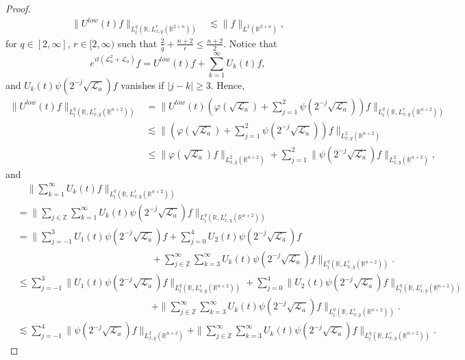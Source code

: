 \documentclass[a4paper,11pt, reqno]{amsart}
\numberwithin{equation}{section}
\theoremstyle{plain}
\theoremstyle{definition}
\theoremstyle{remark}
\begin{document}
\begin{proof}
\begin{align*}
\|U^{low}(t)f\|_{L_t^q(\mathbb{R},L^r_{x,y}(\mathbb{R}^{2+n}))}&\lesssim \|f\|_{L^2(\mathbb{R}^{2+n})},
\end{align*}
for $q\in[2,\infty]$, $r\in [2,\infty)$ such that $\frac{2}{q}+\frac{n+2}{r}\leq \frac{n+2}{2}$. Notice that
\begin{equation*}
e^{it(\mathcal{L}_a^2+\mathcal{L}_a)}f=U^{low}(t)f+\sum_{k=1}^\infty U_k(t)f,
\end{equation*}
and $U_k(t)\psi(2^{-j}\sqrt{\mathcal{L}_a})f$ vanishes if $|j-k|\geq3$. Hence, 
\begin{align*}
\|U^{low}(t)f\|_{L_t^q(\mathbb{R},L^r_{x,y}(\mathbb{R}^{n+2}))}&=\|U^{low}(t)(\varphi(\sqrt{\mathcal{L}_a})+\sum_{j=1}^2\psi(2^{-j}\sqrt{\mathcal{L}_a}))f\|_{L_t^q(\mathbb{R},L^r_{x,y}(\mathbb{R}^{n+2}))}\\
&\lesssim \|(\varphi(\sqrt{\mathcal{L}_a})+\sum_{j=1}^2\psi(2^{-j}\sqrt{\mathcal{L}_a}))f\|_{L^2_{x,y}(\mathbb{R}^{n+2})}\\
&\leq \|\varphi(\sqrt{\mathcal{L}_a})f\|_{L^2_{x,y}(\mathbb{R}^{n+2})}+\sum_{j=1}^2\|\psi(2^{-j}\sqrt{\mathcal{L}_a})f\|_{L^2_{x,y}(\mathbb{R}^{n+2})},
\end{align*}
and
\begin{align*}
&\quad \|\sum_{k=1}^\infty U_k(t)f\|_{L_t^q(\mathbb{R},L^r_{x,y}(\mathbb{R}^{n+2}))}\\
&=\|\sum_{j\in\mathbb{Z}}\sum_{k=1}^\infty U_k(t)\psi(2^{-j}\sqrt{\mathcal{L}_a})f\|_{L_t^q(\mathbb{R},L^r_{x,y}(\mathbb{R}^{n+2}))}\\
&=\Big\|\sum_{j=-1}^3U_1(t)\psi(2^{-j}\sqrt{\mathcal{L}_a})f+\sum_{j=0}^4U_2(t)\psi(2^{-j}\sqrt{\mathcal{L}_a})f\\
&\qquad\qquad\qquad\qquad\qquad\qquad\qquad+\sum_{j\in\mathbb{Z}}^\infty\sum_{k=3}^\infty U_k(t)\psi(2^{-j}\sqrt{\mathcal{L}_a})f\Big\|_{L_t^q(\mathbb{R},L^r_{x,y}(\mathbb{R}^{n+2}))}.\\
&\leq \sum_{j=-1}^3\|U_1(t)\psi(2^{-j}\sqrt{\mathcal{L}_a})f\|_{L_t^q(\mathbb{R},L^r_{x,y}(\mathbb{R}^{n+2}))}+\sum_{j=0}^4\|U_2(t)\psi(2^{-j}\sqrt{\mathcal{L}_a})f\|_{L_t^q(\mathbb{R},L^r_{x,y}(\mathbb{R}^{n+2}))}\\
&\qquad\qquad\qquad\qquad\qquad\qquad\qquad+\|\sum_{j\in\mathbb{Z}}^\infty\sum_{k=3}^\infty U_k(t)\psi(2^{-j}\sqrt{\mathcal{L}_a})f\|_{L_t^q(\mathbb{R},L^r_{x,y}(\mathbb{R}^{n+2}))}.\\
&\lesssim \sum_{j=-1}^4\|\psi(2^{-j}\sqrt{\mathcal{L}_a})f\|_{L^2_{x,y}(\mathbb{R}^{n+2})}+\|\sum_{j\in\mathbb{Z}}^\infty\sum_{k=3}^\infty U_k(t)\psi(2^{-j}\sqrt{\mathcal{L}_a})f\|_{L_t^q(\mathbb{R},L^r_{x,y}(\mathbb{R}^{n+2}))}.

\end{align*}
\end{proof}
\end{document}
